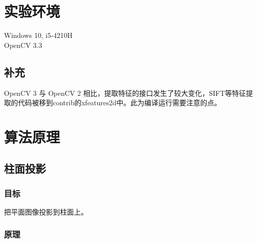 \documentclass{article}
\begin{document}

\section{实验环境}
\begin{description}
\item[Windows 10, i5-4210H]
\item[OpenCV 3.3]
\end{description}
\subsection{补充}
OpenCV 3 与 OpenCV 2 相比，提取特征的接口发生了较大变化，SIFT等特征提取的代码被移到contrib的xfeatures2d中。此为编译运行需要注意的点。

\section{算法原理}

\subsection{柱面投影}
\subsubsection{目标}
把平面图像投影到柱面上。
\subsubsection{原理}
\end{document}
